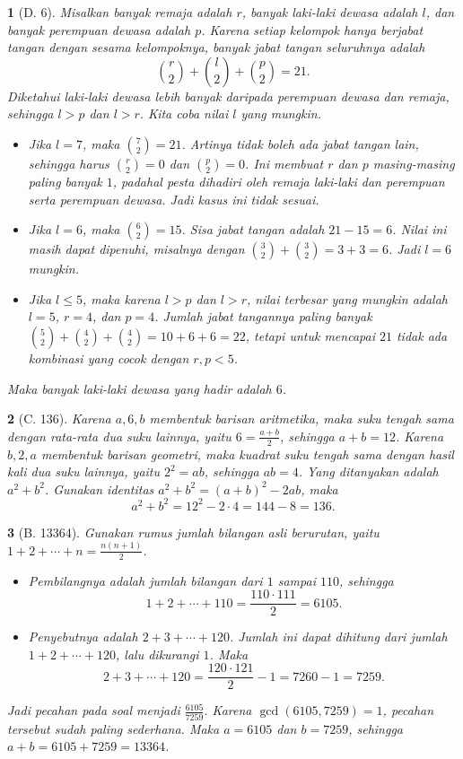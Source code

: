 \documentclass[11pt,a4paper,DIV=12]{scrartcl}
\theoremstyle{problemstyle}
\theoremstyle{answerstyle}
\newtheorem{answer}{}
\begin{document}
\begin{answer}[D. 6]
  Misalkan banyak remaja adalah $r$, banyak laki-laki dewasa adalah $l$, dan banyak perempuan dewasa adalah $p$.
  Karena setiap kelompok hanya berjabat tangan dengan sesama kelompoknya, banyak jabat tangan seluruhnya adalah
  $$\binom{r}{2}+\binom{l}{2}+\binom{p}{2}=21.$$
  Diketahui laki-laki dewasa lebih banyak daripada perempuan dewasa dan remaja, sehingga $l>p$ dan $l>r$. Kita coba nilai $l$ yang mungkin.
  \begin{itemize}
    \item Jika $l=7$, maka $\binom{7}{2}=21$. Artinya tidak boleh ada jabat tangan lain, sehingga harus $\binom{r}{2}=0$ dan $\binom{p}{2}=0$. Ini membuat $r$ dan $p$ masing-masing paling banyak $1$, padahal pesta dihadiri oleh remaja laki-laki dan perempuan serta perempuan dewasa. Jadi kasus ini tidak sesuai.
    \item Jika $l=6$, maka $\binom{6}{2}=15$. Sisa jabat tangan adalah $21-15=6$. Nilai ini masih dapat dipenuhi, misalnya dengan $\binom{3}{2}+\binom{3}{2}=3+3=6$. Jadi $l=6$ mungkin.
    \item Jika $l\leq 5$, maka karena $l>p$ dan $l>r$, nilai terbesar yang mungkin adalah $l=5$, $r=4$, dan $p=4$. Jumlah jabat tangannya paling banyak $\binom{5}{2}+\binom{4}{2}+\binom{4}{2}=10+6+6=22$, tetapi untuk mencapai $21$ tidak ada kombinasi yang cocok dengan $r,p<5$.
  \end{itemize}
  Maka banyak laki-laki dewasa yang hadir adalah $\boxed{6}$.
\end{answer}

\begin{answer}[C. 136]
  Karena $a,6,b$ membentuk barisan aritmetika, maka suku tengah sama dengan rata-rata dua suku lainnya, yaitu $6=\frac{a+b}{2}$, sehingga $a+b=12$. Karena $b,2,a$ membentuk barisan geometri, maka kuadrat suku tengah sama dengan hasil kali dua suku lainnya, yaitu $2^2=ab$, sehingga $ab=4$.
  Yang ditanyakan adalah $a^2+b^2$. Gunakan identitas $a^2+b^2=(a+b)^2-2ab$, maka
  \[
    a^2+b^2=12^2-2\cdot 4=144-8=136.
  \]
\end{answer}

\begin{answer}[B. 13364]
  Gunakan rumus jumlah bilangan asli berurutan, yaitu $1+2+\cdots+n=\frac{n(n+1)}{2}$.
  \begin{itemize}
    \item Pembilangnya adalah jumlah bilangan dari $1$ sampai $110$, sehingga $$1+2+\cdots+110=\frac{110\cdot 111}{2}=6105.$$
    \item Penyebutnya adalah $2+3+\cdots+120$. Jumlah ini dapat dihitung dari jumlah $1+2+\cdots+120$, lalu dikurangi $1$. Maka
          \[
            2+3+\cdots+120=\frac{120\cdot 121}{2}-1=7260-1=7259.
          \]
  \end{itemize}
  Jadi pecahan pada soal menjadi $\frac{6105}{7259}$.
  Karena $\gcd(6105,7259)=1$, pecahan tersebut sudah paling sederhana. Maka $a=6105$ dan $b=7259$, sehingga $a+b=6105+7259=\boxed{13364}$.

\end{answer}
\end{document}
